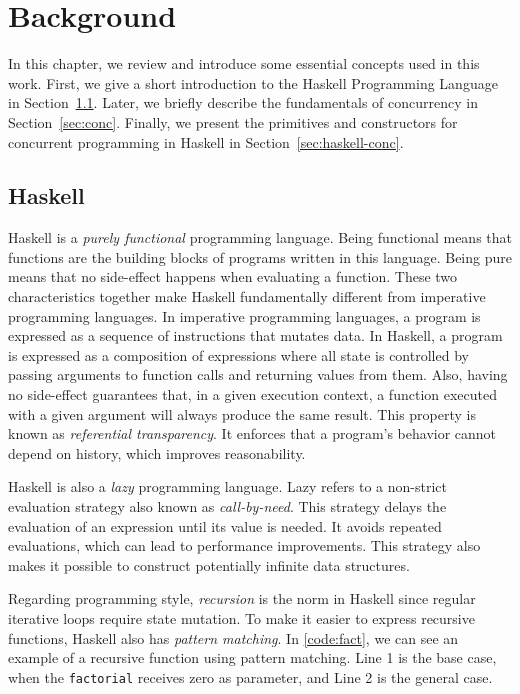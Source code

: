 \chapter{Background}
In this chapter, we review and introduce some essential concepts used in this work. First, we give a short introduction to the Haskell Programming Language in Section~\ref{sec:haskell}. Later, we briefly describe the fundamentals of concurrency in Section~\ref{sec:conc}. Finally, we present the primitives and constructors for concurrent programming in Haskell in Section~\ref{sec:haskell-conc}.

\section{Haskell}\label{sec:haskell}
Haskell is a \emph{purely functional} programming language. Being functional means that functions are the building blocks of programs written in this language. Being pure means that no side-effect happens when evaluating a function. These two characteristics together make Haskell fundamentally different from imperative programming languages. In imperative programming languages, a program is expressed as a sequence of instructions that mutates data. In Haskell, a program is expressed as a composition of expressions where all state is controlled by passing arguments to function calls and returning values from them. Also, having no side-effect guarantees that, in a given execution context, a function executed with a given argument will always produce the same result. This property is known as \emph{referential transparency}. It enforces that a program's behavior cannot depend on history, which improves reasonability.

Haskell is also a \emph{lazy} programming language. Lazy refers to a non-strict evaluation strategy also known as \emph{call-by-need}. This strategy delays the evaluation of an expression until its value is needed. It avoids repeated evaluations, which can lead to performance improvements. This strategy also makes it possible to construct potentially infinite data structures.

Regarding programming style, \emph{recursion} is the norm in Haskell since regular iterative loops require state mutation. To make it easier to express recursive functions, Haskell also has \emph{pattern matching}. In \autoref{code:fact}, we can see an example of a recursive function using pattern matching. Line 1 is the base case, when the \texttt{factorial} receives zero as parameter, and Line 2 is the general case.

